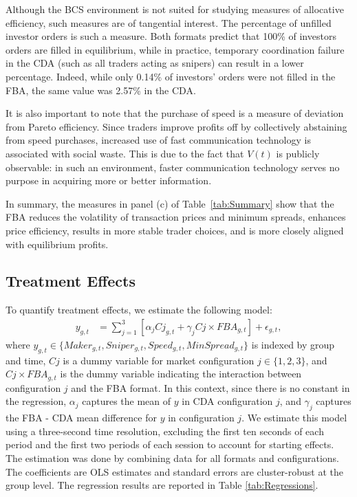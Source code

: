 \documentclass[12pt]{article}
\begin{document}
Although the BCS environment is not suited for studying measures of allocative efficiency, such measures are of tangential interest. The percentage of unfilled investor orders is such a measure.  Both formats predict that 100\% of investors orders are filled in equilibrium, while in practice, temporary coordination failure in the CDA (such as all traders acting as snipers) can result in a lower percentage. Indeed, while only 0.14\% of investors' orders were not filled in the FBA, the same value was 2.57\% in the CDA.

It is also important to note that the purchase of speed is a measure of deviation from Pareto efficiency. Since traders improve profits off by collectively abstaining from speed purchases, increased use of fast communication technology is associated with social waste. This is due to the fact that $V(t)$ is publicly observable: in such an environment, faster communication technology serves no purpose in acquiring more or better information. 

In summary, the measures in panel (c) of Table~\ref{tab:Summary} show that the FBA reduces the volatility of transaction prices and minimum spreads, enhances price efficiency, results in more stable trader choices, and is more closely aligned with equilibrium profits.

\subsection{Treatment Effects}
\label{regression}

To quantify treatment effects, we estimate the following model: 
\begin{align} \label{eq:RegSpec}
y_{g,t} & = \sum_{j=1}^{3} \left[ \alpha_j Cj_{g,t} + \gamma_j  Cj \times FBA_{g,t}   \right]  + \epsilon_{g,t},
\end{align}
where $y_{g,t} \in \{Maker_{g,t},Sniper_{g,t},Speed_{g,t},MinSpread_{g,t}\}$ is indexed by group and time, $Cj$ is a dummy variable for market configuration $j \in \{1,2,3\}$, and $Cj \times FBA_{g,t}$ is the dummy variable indicating  the interaction between configuration $j$ and the FBA format. 
In this context, since there is no constant in the regression, $\alpha_j$ captures the mean of $y$ in CDA configuration $j$, and $\gamma_j$ captures the FBA - CDA mean difference for $y$ in configuration $j$. 
We estimate this model using a three-second time resolution, excluding the first ten seconds of each period and the first two periods of each session to account for starting effects. The estimation was done by combining data for all formats and configurations.  The coefficients are OLS estimates and standard errors are cluster-robust at the group level.  The regression results are reported in Table \ref{tab:Regressions}. 
\end{document}
